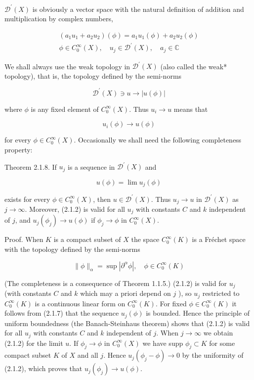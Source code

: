$\mathscr{D}^{\prime}(X)$ is obviously a vector space with the natural definition of addition and multiplication by complex numbers,

\[
\begin{gathered}
\left(a_{1} u_{1}+a_{2} u_{2}\right)(\phi)=a_{1} u_{1}(\phi)+a_{2} u_{2}(\phi) \\
\phi \in C_{0}^{\infty}(X), \quad u_{j} \in \mathscr{D}^{\prime}(X), \quad a_{j} \in \mathbb{C}
\end{gathered}
\]

We shall always use the weak topology in $\mathscr{D}^{\prime}(X)$ (also called the weak* topology), that is, the topology defined by the semi-norms

\[
\mathscr{D}^{\prime}(X) \ni u \rightarrow|u(\phi)|
\]

where $\phi$ is any fixed element of $C_{0}^{\infty}(X)$. Thus $u_{i} \rightarrow u$ means that

\[
u_{i}(\phi) \rightarrow u(\phi)
\]

for every $\phi \in C_{0}^{\infty}(X)$. Occasionally we shall need the following completeness property:

Theorem 2.1.8. If $u_{j}$ is a sequence in $\mathscr{D}^{\prime}(X)$ and


\begin{equation*}
u(\phi)=\lim u_{j}(\phi) \tag{2.1.7}
\end{equation*}


exists for every $\phi \in C_{0}^{\infty}(X)$, then $u \in \mathscr{D}^{\prime}(X)$. Thus $u_{j} \rightarrow u$ in $\mathscr{D}^{\prime}(X)$ as $j \rightarrow \infty$. Moreover, (2.1.2) is valid for all $u_{j}$ with constants $C$ and $k$ independent of $j$, and $u_{j}\left(\phi_{j}\right) \rightarrow u(\phi)$ if $\phi_{j} \rightarrow \phi$ in $C_{0}^{\infty}(X)$.

Proof. When $K$ is a compact subset of $X$ the space $C_{0}^{\infty}(K)$ is a Fréchet space with the topology defined by the semi-norms

\[
\|\phi\|_{\alpha}=\sup \left|\partial^{\alpha} \phi\right|, \quad \phi \in C_{0}^{\infty}(K)
\]

(The completeness is a consequence of Theorem 1.1.5.) (2.1.2) is valid for $u_{j}$ (with constants $C$ and $k$ which may a priori depend on $j$ ), so $u_{j}$ restricted to $C_{0}^{\infty}(K)$ is a continuous linear form on $C_{0}^{\infty}(K)$. For fixed $\phi \in C_{0}^{\infty}(K)$ it follows from (2.1.7) that the sequence $u_{j}(\phi)$ is bounded. Hence the principle of uniform boundedness (the Banach-Steinhaus theorem) shows that (2.1.2) is valid for all $u_{j}$ with constants $C$ and $k$ independent of $j$. When $j \rightarrow \infty$ we obtain (2.1.2) for the limit $u$. If $\phi_{j} \rightarrow \phi$ in $C_{0}^{\infty}(X)$ we have supp $\phi_{j} \subset K$ for some compact subset $K$ of $X$ and all $j$. Hence $u_{j}\left(\phi_{j}-\phi\right) \rightarrow 0$ by the uniformity of (2.1.2), which proves that $u_{j}\left(\phi_{j}\right) \rightarrow u(\phi)$.

